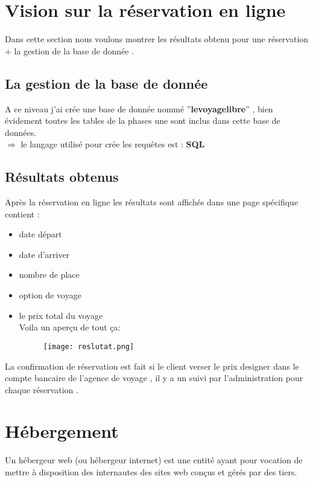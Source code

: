 \documentclass[a4paper,12pt]{report}
\begin{document}
\section{Vision sur la réservation en ligne}
\begin{tcolorbox}
Dans cette section nous voulons montrer les résultats obtenu pour une réservation + la gestion de la base de donnée .
\end{tcolorbox}
\subsection{La gestion de la base de donnée}
A ce niveau j'ai crée une base de donnée nommé ''\textbf{levoyagelibre}'' , bien évidement toutes les tables de la phases une sont inclus dans cette base de données.\\
$\Rightarrow$ le langage utilisé pour crée les requêtes est : \textbf{SQL}
\subsection{Résultats obtenus}
Après la réservation en ligne les résultats sont affichés dans une page  spécifique contient :
\begin{itemize}
\item date départ
\item date d'arriver
\item nombre de place
\item option de voyage
\item le prix total du voyage 
\\Voila un aperçu de tout ça:
\begin{figure}[H]
\begin{center}
\centering
\texttt{[image: reslutat.png]}
\end{center}
\label{Result}
\end{figure}
\end{itemize}
La confirmation de réservation est fait si le client verser le prix designer dans le compte bancaire de l'agence de voyage , il y a un suivi par l'administration pour chaque réservation .
\section{Hébergement}
Un hébergeur web (ou hébergeur internet) est une entité ayant pour vocation de mettre à disposition des internautes des sites web conçus et gérés par des tiers.
\end{document}
